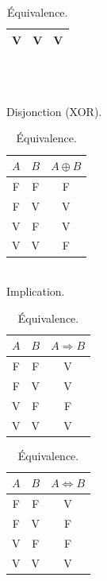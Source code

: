 \documentclass[a4paper, 12pt]{article}
\newcommand{\ffi}{\Leftrightarrow}
\newcommand{\imply}{\Rightarrow}
\numberwithin{equation}{subsection}
\begin{document}
\begin{table}[H]
\begin{minipage}[c]{0.27\linewidth}
\begin{tabular}{|c|c|c|}
                V  &  V  &      V      \\
        \hline
    \end{tabular}
  \end{minipage}
  \\[1.0cm]
  \begin{minipage}[c]{0.27\linewidth}
    \centering
    \caption{\\Disjonction (XOR).}
    \label{xor_table}
      \begin{tabular}{|c|c|c|}
        \hline $A$ & $B$ & $A \oplus B$ \\
        \hline  F  &  F  &       F      \\
                F  &  V  &       V      \\
                V  &  F  &       V      \\
                V  &  V  &       F      \\
        \hline
      \end{tabular}
    \end{minipage}
    \hspace{1.0cm}
    \begin{minipage}[c]{0.22\linewidth}
      \centering
      \caption{\\Implication.}
      \label{imply_table}
      \begin{tabular}{|c|c|c|}
        \hline $A$ & $B$ & $A \imply B$ \\
        \hline  F  &  F  &       V        \\
                F  &  V  &       V        \\
                V  &  F  &       F        \\
                V  &  V  &       V        \\
        \hline
      \end{tabular}
    \end{minipage}
    \hspace{1.0cm}
    \begin{minipage}[c]{0.15\linewidth}
      \centering
      \caption{Équivalence.}
      \label{iff_table}
      \begin{tabular}{|c|c|c|}
        \hline $A$ & $B$ & $A \ffi B$ \\
        \hline  F  &  F  &      V     \\
                F  &  V  &      F     \\
                V  &  F  &      F     \\
                V  &  V  &      V     \\
        \hline
      \end{tabular}
    \end{minipage}
  \end{table}
\end{document}
